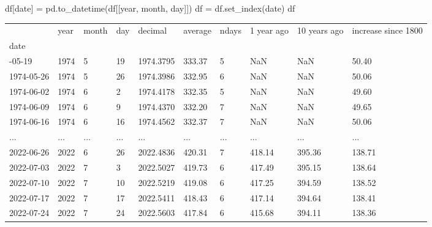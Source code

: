 \documentclass[
  letterpaper,
  DIV=11,
  numbers=noendperiod,
  oneside]{scrreprt}
\newenvironment{Shaded}{\begin{snugshade}}{\end{snugshade}}
\newcommand{\NormalTok}[1]{\textcolor[rgb]{0.00,0.23,0.31}{#1}}
\newcommand{\OperatorTok}[1]{\textcolor[rgb]{0.37,0.37,0.37}{#1}}
\newcommand{\StringTok}[1]{\textcolor[rgb]{0.13,0.47,0.30}{#1}}
\begin{document}
\begin{Shaded}
\begin{Highlighting}[]
\NormalTok{df[}\StringTok{\textquotesingle{}date\textquotesingle{}}\NormalTok{] }\OperatorTok{=}\NormalTok{ pd.to\_datetime(df[[}\StringTok{\textquotesingle{}year\textquotesingle{}}\NormalTok{, }\StringTok{\textquotesingle{}month\textquotesingle{}}\NormalTok{, }\StringTok{\textquotesingle{}day\textquotesingle{}}\NormalTok{]])}
\NormalTok{df }\OperatorTok{=}\NormalTok{ df.set\_index(}\StringTok{\textquotesingle{}date\textquotesingle{}}\NormalTok{)}
\NormalTok{df}
\end{Highlighting}
\end{Shaded}

\begin{longtable}[]{@{}llllllllll@{}}
\toprule\noalign{}
& year & month & day & decimal & average & ndays & 1 year ago & 10 years
ago & increase since 1800 \\
date & & & & & & & & & \\
\midrule\noalign{}
\endhead
\bottomrule\noalign{}
\endlastfoot
1974-05-19 & 1974 & 5 & 19 & 1974.3795 & 333.37 & 5 & NaN & NaN &
50.40 \\
1974-05-26 & 1974 & 5 & 26 & 1974.3986 & 332.95 & 6 & NaN & NaN &
50.06 \\
1974-06-02 & 1974 & 6 & 2 & 1974.4178 & 332.35 & 5 & NaN & NaN &
49.60 \\
1974-06-09 & 1974 & 6 & 9 & 1974.4370 & 332.20 & 7 & NaN & NaN &
49.65 \\
1974-06-16 & 1974 & 6 & 16 & 1974.4562 & 332.37 & 7 & NaN & NaN &
50.06 \\
... & ... & ... & ... & ... & ... & ... & ... & ... & ... \\
2022-06-26 & 2022 & 6 & 26 & 2022.4836 & 420.31 & 7 & 418.14 & 395.36 &
138.71 \\
2022-07-03 & 2022 & 7 & 3 & 2022.5027 & 419.73 & 6 & 417.49 & 395.15 &
138.64 \\
2022-07-10 & 2022 & 7 & 10 & 2022.5219 & 419.08 & 6 & 417.25 & 394.59 &
138.52 \\
2022-07-17 & 2022 & 7 & 17 & 2022.5411 & 418.43 & 6 & 417.14 & 394.64 &
138.41 \\
2022-07-24 & 2022 & 7 & 24 & 2022.5603 & 417.84 & 6 & 415.68 & 394.11 &
138.36 \\
\end{longtable}
\end{document}

